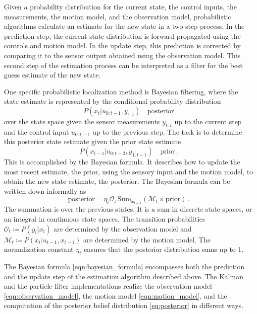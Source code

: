 \documentclass[10pt,journal,compsoc]{IEEEtran}
\begin{document}
Given a probability distribution for the current state, the control inputs, the measurements, the motion model, and the observation model, probabilistic algorithms calculate an estimate for the new state in a two step process. In the prediction step, the current state distribution is forward propagated using the controls and motion model. In the update step, this prediction is corrected by comparing it to the sensor output obtained using the observation model. This second step of the estimation process can be interpreted as a filter for the best guess estimate of the new state. 

One specific probabilistic localization method is Bayesian filtering, where the state estimate is represented by the conditional probability distribution 
\begin{equation}
\label{eq:posterior}
P\left( x_t \vert u_{0:t-1}, y_{1:t}\right) \quad \mathrm{posterior}
\end{equation}
over the state space given the sensor measurements $y_{1:t}$ up to the current step and the control input $u_{0:t-1}$ up to the previous step. The task is to determine this posterior state estimate given the prior state estimate 
\begin{equation}
\label{eqn:prior}
P\left( x_{t-1} \vert u_{0:t-2}, y_{1:t-1}\right) \quad \mathrm{prior} \, .
\end{equation}
This is accomplished by the Bayesian formula. It describes how to update the most recent estimate, the prior, using the sensory input and the motion model, to obtain the new state estimate, the posterior. The Bayesian formula can be written down informally as
\begin{equation}
\label{eqn:bayesian_formula}
\mathrm{posterior}  =  \eta_t \mathcal{O}_t \, \mathrm{Sum}_{x_{t-1}} \left( \mathcal{M}_t \times \mathrm{prior}\right) \, .
\end{equation}
The summation is over the previous states. It is a sum in discrete state spaces, or an integral in continuous state spaces. The transition probabilities $\mathcal{O}_t \coloneqq P \left( y_t \vert x_t \right)$ are determined by the observation model and $\mathcal{M}_t \coloneqq P \left( x_t \vert u_{t-1}, x_{t-1} \right)$ are determined by the motion model. The normalization constant $\eta_t$ ensures that the posterior distribution sums up to $1$.

The Bayesian formula \ref{eqn:bayesian_formula} encompasses both the prediction and the update step of the estimation algorithm described above. The Kalman and the particle filter implementations realize the observation model \ref{eqn:observation_model}, the motion model \ref{eqn:motion_model}, and the computation of the posterior belief distribution \ref{eq:posterior} in different ways.
\end{document}
